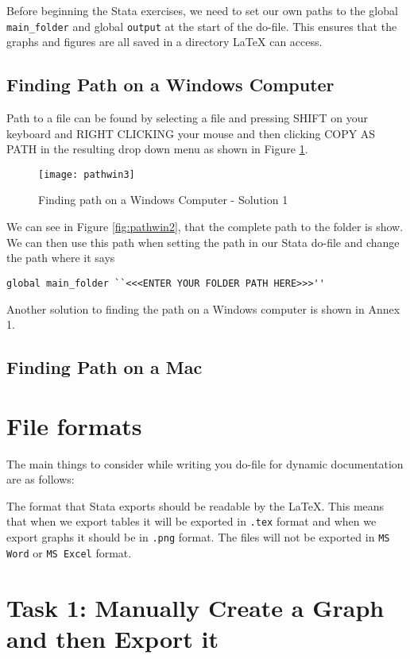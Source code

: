 \documentclass[]{article}
\begin{document}
Before beginning the Stata exercises, we need to set our own paths to the global \texttt{main\_folder} and global \texttt{output} at the start of the do-file. This ensures that the graphs and figures are all saved in a directory {\LaTeX} can access. 

\subsection*{Finding Path on a Windows Computer}

Path to a file can be found by selecting a file and pressing {\color{red}SHIFT on your keyboard and RIGHT CLICKING your mouse and then clicking COPY AS PATH in the resulting drop down menu} as shown in Figure \ref{fig:pathwin3}.

\begin{figure}[H]
	\centering
	\texttt{[image: pathwin3]}
	\caption{Finding path on a Windows Computer - Solution 1}
	\label{fig:pathwin3}
\end{figure}

We can see in Figure \ref{fig:pathwin2}, that the complete path to the folder is show. We can then use this path when setting the path in our Stata do-file and change the path where it says \begin{verbatim}
global main_folder ``<<<ENTER YOUR FOLDER PATH HERE>>>''
\end{verbatim} 

Another solution to finding the path on a Windows computer is shown in Annex 1.
	
\subsection*{Finding Path on a Mac}


\section*{File formats}
The main things to consider while writing you do-file for dynamic documentation are as follows: 

The format that Stata exports should be readable by the {\LaTeX}. This means that when we export tables it will be exported in \texttt{.tex} format and when we export graphs it should be in \texttt{.png} format. 
The files will not be exported in \texttt{MS Word} or \texttt{MS Excel} format.

\section*{Task 1: Manually Create a Graph and then Export it}
\end{document}
